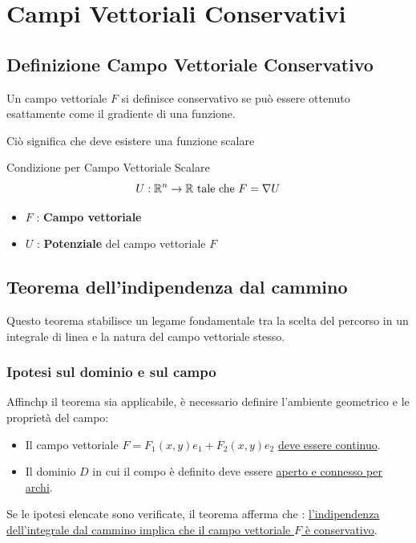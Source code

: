 \chapter{Campi Vettoriali Conservativi}
\section{Definizione Campo Vettoriale Conservativo}
Un campo vettoriale $F$ si definisce conservativo se può essere ottenuto esattamente come il gradiente di una funzione.

\vspace{\baselineskip}

Ciò significa che deve esistere una funzione scalare 
\begin{definizione}[]{Condizione per Campo Vettoriale Scalare}
    $$
        U:\mathbb{R}^n \to \mathbb{R} \text{ tale che } F = \nabla U
    $$
    \begin{itemize}
        \item $F$ : \textbf{Campo vettoriale}
        \item $U$ : \textbf{Potenziale} del campo vettoriale $F$
    \end{itemize}
\end{definizione}

\newpage

\section{Teorema dell'indipendenza dal cammino}
Questo teorema stabilisce un legame fondamentale tra la scelta del percorso in un integrale di linea e la natura del campo vettoriale stesso.

\subsection{Ipotesi sul dominio e sul campo}
Affinchp il teorema sia applicabile, è necessario definire l'ambiente geometrico e le proprietà del campo:

\begin{itemize}
    \item Il campo vettoriale $F=F_{1}(x,y)e_{1}+F_{2}(x,y)e_{2}$ \uline{deve essere continuo}.
    \item Il dominio $D$ in cui il compo è definito deve essere \uline{aperto e connesso per archi}.
\end{itemize}

Se le ipotesi elencate sono verificate, il teorema afferma che : \uline{l'indipendenza dell'integrale dal cammino implica che il campo vettoriale $F$ è conservativo}.

